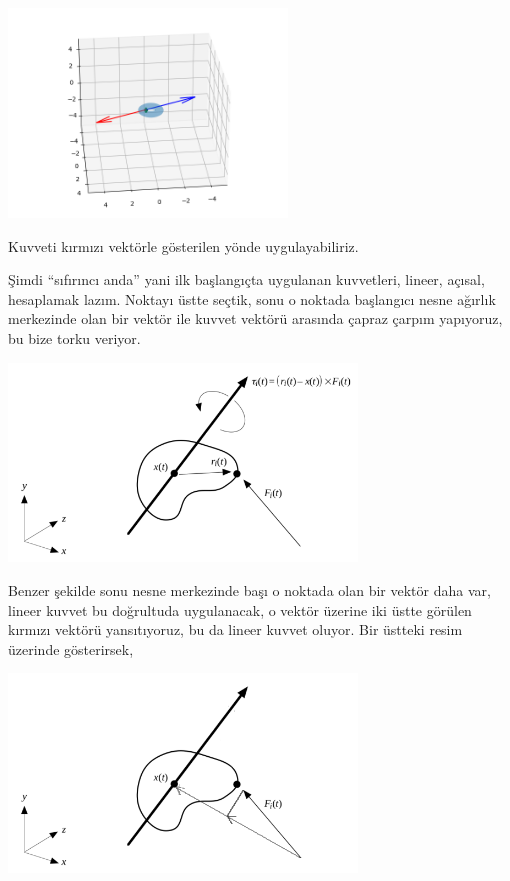 \documentclass[12pt,fleqn]{article}\usepackage{../../common}
\begin{document}
\includegraphics[width=20em]{compscieng_bpp32sim_rigbod_02.png}

Kuvveti kırmızı vektörle gösterilen yönde uygulayabiliriz.

Şimdi ``sıfırıncı anda'' yani ilk başlangıçta uygulanan kuvvetleri, lineer,
açısal, hesaplamak lazım. Noktayı üstte seçtik, sonu o noktada başlangıcı nesne
ağırlık merkezinde olan bir vektör ile kuvvet vektörü arasında çapraz çarpım
yapıyoruz, bu bize torku veriyor.

\includegraphics[width=25em]{compscieng_bpp32sim_rigbod_03.png}

Benzer şekilde sonu nesne merkezinde başı o noktada olan bir vektör daha var,
lineer kuvvet bu doğrultuda uygulanacak, o vektör üzerine iki üstte görülen
kırmızı vektörü yansıtıyoruz, bu da lineer kuvvet oluyor. Bir üstteki resim
üzerinde gösterirsek,

\includegraphics[width=25em]{compscieng_bpp32sim_rigbod_04.png}
\end{document}
